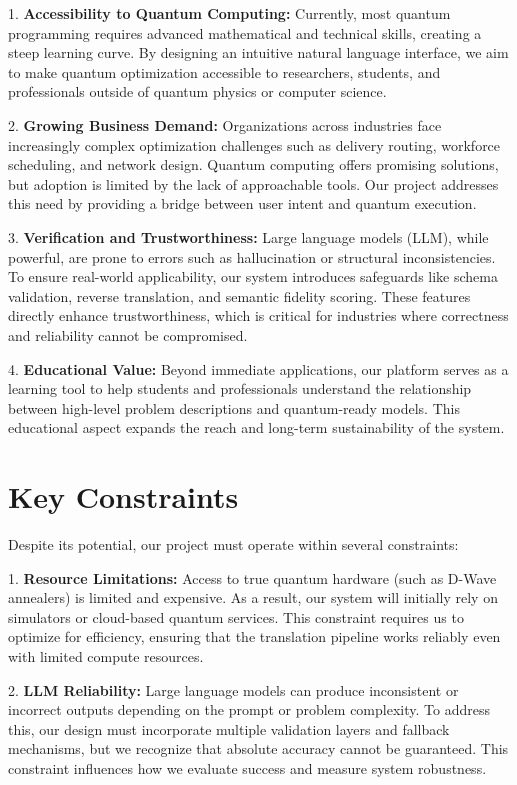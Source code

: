 1. \textbf{Accessibility to Quantum Computing:} Currently, most quantum programming requires advanced mathematical and technical skills, creating a steep learning curve. By designing an intuitive natural language interface, we aim to make quantum optimization accessible to researchers, students, and professionals outside of quantum physics or computer science.  

2. \textbf{Growing Business Demand:} Organizations across industries face increasingly complex optimization challenges such as delivery routing, workforce scheduling, and network design. Quantum computing offers promising solutions, but adoption is limited by the lack of approachable tools. Our project addresses this need by providing a bridge between user intent and quantum execution.  

3. \textbf{Verification and Trustworthiness:} Large language models (\gls{LLM}), while powerful, are prone to errors such as hallucination or structural inconsistencies. To ensure real-world applicability, our system introduces safeguards like schema validation, reverse translation, and semantic \gls{fidelity} scoring. These features directly enhance trustworthiness, which is critical for industries where correctness and reliability cannot be compromised.  

4. \textbf{Educational Value:} Beyond immediate applications, our platform serves as a learning tool to help students and professionals understand the relationship between high-level problem descriptions and quantum-ready models. This educational aspect expands the reach and long-term sustainability of the system.  


\section*{Key Constraints}
Despite its potential, our project must operate within several constraints:  

1. \textbf{Resource Limitations:} Access to true quantum hardware (such as D-Wave annealers) is limited and expensive. As a result, our system will initially rely on simulators or cloud-based quantum services. This constraint requires us to optimize for efficiency, ensuring that the translation pipeline works reliably even with limited compute resources.  

2. \textbf{LLM Reliability:} Large language models can produce inconsistent or incorrect outputs depending on the prompt or problem complexity. To address this, our design must incorporate multiple validation layers and fallback mechanisms, but we recognize that absolute accuracy cannot be guaranteed. This constraint influences how we evaluate success and measure system robustness.  

